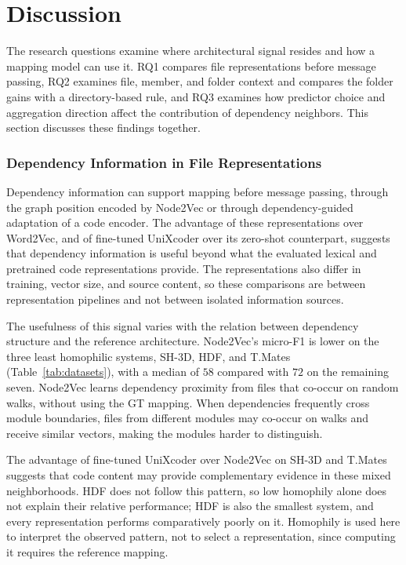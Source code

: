 \section{Discussion\label{sec:discussion}}
The research questions examine where architectural signal resides and how a mapping model can use it. RQ1 compares file representations before message passing, RQ2 examines file, member, and folder context and compares the folder gains with a directory-based rule, and RQ3 examines how predictor choice and aggregation direction affect the contribution of dependency neighbors. This section discusses these findings together.

\subsubsection*{Dependency Information in File Representations}
Dependency information can support mapping before message passing, through the graph position encoded by Node2Vec or through dependency-guided adaptation of a code encoder. The advantage of these representations over Word2Vec, and of fine-tuned UniXcoder over its zero-shot counterpart, suggests that dependency information is useful beyond what the evaluated lexical and pretrained code representations provide. The representations also differ in training, vector size, and source content, so these comparisons are between representation pipelines and not between isolated information sources.

The usefulness of this signal varies with the relation between dependency structure and the reference architecture. Node2Vec’s micro-F1 is lower on the three least homophilic systems, SH-3D, HDF, and T.Mates (Table~\ref{tab:datasets}), with a median of $58$ compared with $72$ on the remaining seven. Node2Vec learns dependency proximity from files that co-occur on random walks, without using the GT mapping. When dependencies frequently cross module boundaries, files from different modules may co-occur on walks and receive similar vectors, making the modules harder to distinguish.

The advantage of fine-tuned UniXcoder over Node2Vec on SH-3D and T.Mates suggests that code content may provide complementary evidence in these mixed neighborhoods. HDF does not follow this pattern, so low homophily alone does not explain their relative performance; HDF is also the smallest system, and every representation performs comparatively poorly on it. Homophily is used here to interpret the observed pattern, not to select a representation, since computing it requires the reference mapping.
 
